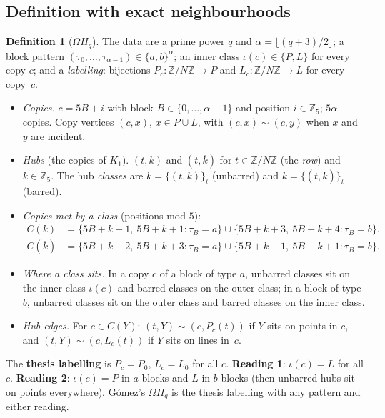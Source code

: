 \documentclass[11pt]{amsart}
\theoremstyle{plain}
\theoremstyle{definition}
\newtheorem{definition}[lemma]{Definition}
\theoremstyle{remark}
\newcommand{\bk}[1]{\overline{#1}}
\newcommand{\Om}{\Omega}
\newcommand{\pP}{P}  %
\newcommand{\lL}{L}  %
\begin{document}
\subsection{Definition with exact neighbourhoods}

\begin{definition}[$\Om H_q$]\label{def:omega}
The data are a prime power $q$ and $\alpha = \lfloor (q+3)/2 \rfloor$; a block pattern
$(\tau_0, \dots, \tau_{\alpha-1}) \in \{a,b\}^\alpha$; an inner class $\iota(c) \in \{\pP, \lL\}$ for every copy $c$; and a
\emph{labelling}: bijections $P_c\colon \mathbb{Z}/N\mathbb{Z} \to \pP$ and $L_c\colon \mathbb{Z}/N\mathbb{Z} \to \lL$ for
every copy~$c$.
\begin{itemize}[leftmargin=1.5em]
\item \emph{Copies.} $c = 5B + i$ with block $B \in \{0, \dots, \alpha-1\}$ and position $i \in \mathbb{Z}_5$; $5\alpha$
  copies. Copy vertices $(c,x)$, $x \in \pP \cup \lL$, with $(c,x) \sim (c,y)$ when $x$ and $y$ are incident.
\item \emph{Hubs} (the copies of $K_1$). $(t,k)$ and $(t,\bk k)$ for $t \in \mathbb{Z}/N\mathbb{Z}$ (the \emph{row}) and
  $k \in \mathbb{Z}_5$. The hub \emph{classes} are $k = \{(t,k)\}_t$ (unbarred) and $\bk k = \{(t,\bk k)\}_t$ (barred).
\item \emph{Copies met by a class} (positions mod $5$):
  \begin{align*}
  C(k) &= \{5B + k - 1,\ 5B + k + 1 : \tau_B = a\} \cup \{5B + k + 3,\ 5B + k + 4 : \tau_B = b\},\\
  C(\bk k) &= \{5B + k + 2,\ 5B + k + 3 : \tau_B = a\} \cup \{5B + k - 1,\ 5B + k + 1 : \tau_B = b\}.
  \end{align*}
\item \emph{Where a class sits.} In a copy $c$ of a block of type $a$, unbarred classes sit on the inner class $\iota(c)$
  and barred classes on the outer class; in a block of type $b$, unbarred classes sit on the outer class and barred
  classes on the inner class.
\item \emph{Hub edges.} For $c \in C(Y)$: $(t,Y) \sim (c, P_c(t))$ if $Y$ sits on points in $c$, and
  $(t,Y) \sim (c, L_c(t))$ if $Y$ sits on lines in~$c$.
\end{itemize}
The \textbf{thesis labelling} is $P_c = P_0$, $L_c = L_0$ for all $c$. \textbf{Reading 1}: $\iota(c) = \lL$ for all $c$.
\textbf{Reading 2}: $\iota(c) = \pP$ in $a$-blocks and $\lL$ in $b$-blocks (then unbarred hubs sit on points everywhere).
Gómez's $\Om H_q$ is the thesis labelling with any pattern and either reading.
\end{definition}
\end{document}
